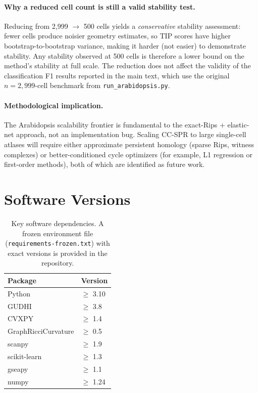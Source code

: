\documentclass[11pt]{article}
\begin{document}
\paragraph{Why a reduced cell count is still a valid stability test.}
Reducing from 2{,}999 $\to$ 500 cells yields a \emph{conservative} stability assessment: fewer cells produce noisier geometry estimates, so TIP scores have higher bootstrap-to-bootstrap variance, making it harder (not easier) to demonstrate stability.
Any stability observed at 500 cells is therefore a lower bound on the method's stability at full scale.
The reduction does not affect the validity of the classification F1 results reported in the main text, which use the original $n = 2{,}999$-cell benchmark from \texttt{run\_arabidopsis.py}.

\paragraph{Methodological implication.}
The Arabidopsis scalability frontier is fundamental to the exact-Rips + elastic-net approach, not an implementation bug.
Scaling CC-SPR to large single-cell atlases will require either approximate persistent homology (sparse Rips, witness complexes) or better-conditioned cycle optimizers (for example, L1 regression or first-order methods), both of which are identified as future work.


\section{Software Versions}
\label{sec:supp_software}

\begin{table}[h]
\centering
\small
\begin{tabular}{ll}
\toprule
Package & Version \\
\midrule
Python & $\geq$ 3.10 \\
GUDHI & $\geq$ 3.8 \\
CVXPY & $\geq$ 1.4 \\
GraphRicciCurvature & $\geq$ 0.5 \\
scanpy & $\geq$ 1.9 \\
scikit-learn & $\geq$ 1.3 \\
gseapy & $\geq$ 1.1 \\
numpy & $\geq$ 1.24 \\
\bottomrule
\end{tabular}
\caption{Key software dependencies. A frozen environment file (\texttt{requirements-frozen.txt}) with exact versions is provided in the repository.}
\label{tab:supp_software}
\end{table}
\end{document}
